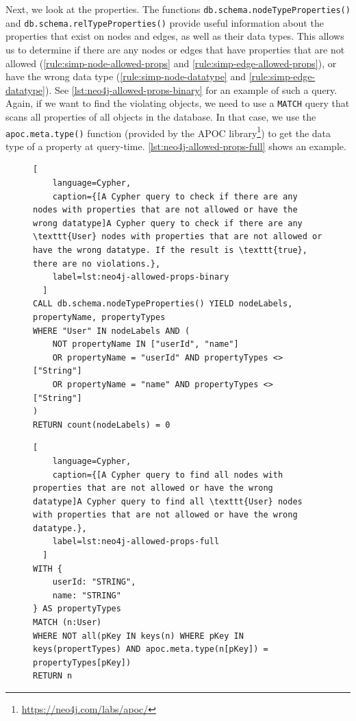 \documentclass{report}
\theoremstyle{definition}
\begin{document}
Next, we look at the properties. The functions \texttt{db.schema.nodeTypeProperties()} and \texttt{db.schema.relTypeProperties()} provide useful information about the properties that exist on nodes and edges, as well as their data types. This allows us to determine if there are any nodes or edges that have properties that are not allowed (\autoref{rule:simp-node-allowed-props} and \ref{rule:simp-edge-allowed-props}), or have the wrong data type (\autoref{rule:simp-node-datatype} and \ref{rule:simp-edge-datatype}). See \autoref{lst:neo4j-allowed-props-binary} for an example of such a query. Again, if we want to find the violating objects, we need to use a \texttt{MATCH} query that scans all properties of all objects in the database. In that case, we use the \texttt{apoc.meta.type()} function (provided by the APOC library\footnote{\url{https://neo4j.com/labs/apoc/}}) to get the data type of a property at query-time. \autoref{lst:neo4j-allowed-props-full} shows an example.

\begin{figure}[H]
  \begin{lstlisting}[
    language=Cypher,
    caption={[A Cypher query to check if there are any nodes with properties that are not allowed or have the wrong datatype]A Cypher query to check if there are any \texttt{User} nodes with properties that are not allowed or have the wrong datatype. If the result is \texttt{true}, there are no violations.},
    label=lst:neo4j-allowed-props-binary
  ]
CALL db.schema.nodeTypeProperties() YIELD nodeLabels, propertyName, propertyTypes
WHERE "User" IN nodeLabels AND (
    NOT propertyName IN ["userId", "name"]
    OR propertyName = "userId" AND propertyTypes <> ["String"]
    OR propertyName = "name" AND propertyTypes <> ["String"]
)
RETURN count(nodeLabels) = 0
  \end{lstlisting}
\end{figure}
\vspace*{-8pt}
\begin{figure}[H]
  \begin{lstlisting}[
    language=Cypher,
    caption={[A Cypher query to find all nodes with properties that are not allowed or have the wrong datatype]A Cypher query to find all \texttt{User} nodes with properties that are not allowed or have the wrong datatype.},
    label=lst:neo4j-allowed-props-full
  ]
WITH {
    userId: "STRING",
    name: "STRING"
} AS propertyTypes
MATCH (n:User)
WHERE NOT all(pKey IN keys(n) WHERE pKey IN keys(propertTypes) AND apoc.meta.type(n[pKey]) = propertyTypes[pKey])
RETURN n
  \end{lstlisting}
\end{figure}
\end{document}

